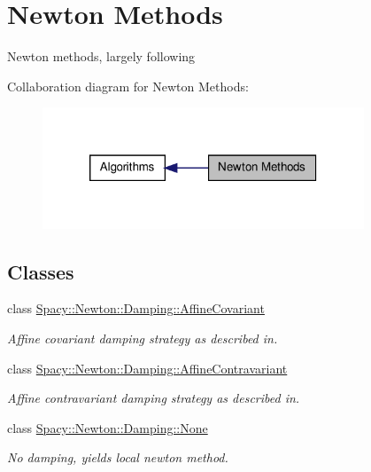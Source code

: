 \hypertarget{group__NewtonGroup}{\section{\-Newton \-Methods}
\label{group__NewtonGroup}
}


\-Newton methods, largely following  


\-Collaboration diagram for \-Newton \-Methods\-:
\nopagebreak
\begin{figure}[H]
\begin{center}
\leavevmode
\includegraphics[width=272pt]{group__NewtonGroup}
\end{center}
\end{figure}
\subsection*{\-Classes}
\begin{DoxyCompactItemize}
\item 
class \hyperlink{classSpacy_1_1Newton_1_1Damping_1_1AffineCovariant}{\-Spacy\-::\-Newton\-::\-Damping\-::\-Affine\-Covariant}
\begin{DoxyCompactList}\small\item\em \-Affine covariant damping strategy as described in. \end{DoxyCompactList}\item 
class \hyperlink{classSpacy_1_1Newton_1_1Damping_1_1AffineContravariant}{\-Spacy\-::\-Newton\-::\-Damping\-::\-Affine\-Contravariant}
\begin{DoxyCompactList}\small\item\em \-Affine contravariant damping strategy as described in. \end{DoxyCompactList}\item 
class \hyperlink{classSpacy_1_1Newton_1_1Damping_1_1None}{\-Spacy\-::\-Newton\-::\-Damping\-::\-None}
\begin{DoxyCompactList}\small\item\em \-No damping, yields local newton method. \end{DoxyCompactList}\end{DoxyCompactItemize}
